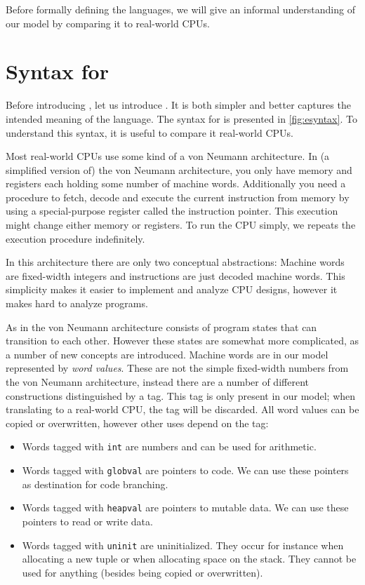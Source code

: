 Before formally defining the languages, we will give an informal understanding
of our model by comparing it to real-world CPUs.

\section{Syntax for \ATALe}

Before introducing \ATAL, let us introduce \ATALe. It is both simpler and better
captures the intended meaning of the language. The syntax for \ATALe is
presented in \cref{fig:esyntax}. To understand this syntax, it is useful to
compare it real-world CPUs.

Most real-world CPUs use some kind of a von Neumann architecture. In (a
simplified version of) the von Neumann architecture, you only have memory and
registers each holding some number of machine words. Additionally you need a
procedure to fetch, decode and execute the current instruction from memory by
using a special-purpose register called the instruction pointer. This execution
might change either memory or registers. To run the CPU simply, we repeats the
execution procedure indefinitely.

In this architecture there are only two conceptual abstractions: Machine words
are fixed-width integers and instructions are just decoded machine words. This
simplicity makes it easier to implement and analyze CPU designs, however it
makes hard to analyze programs.

As in the von Neumann architecture \ATALe consists of program states that can
transition to each other. However these states are somewhat more complicated, as
a number of new concepts are introduced. Machine words are in our model
represented by \emph{word values}. These are not the simple fixed-width numbers
from the von Neumann architecture, instead there are a number of different
constructions distinguished by a tag. This tag is only present in our model;
when translating to a real-world CPU, the tag will be discarded. All word values
can be copied or overwritten, however other uses depend on the tag:

\begin{itemize}
\item Words tagged with \texttt{int} are numbers and can be used for
  arithmetic.
\item Words tagged with \texttt{globval} are pointers to code. We can use these
  pointers as destination for code branching.
\item Words tagged with \texttt{heapval} are pointers to mutable data. We can
  use these pointers to read or write data.
\item Words tagged with \texttt{uninit} are uninitialized. They occur for
  instance when allocating a new tuple or when allocating space on the
  stack. They cannot be used for anything (besides being copied or overwritten).
\end{itemize}

